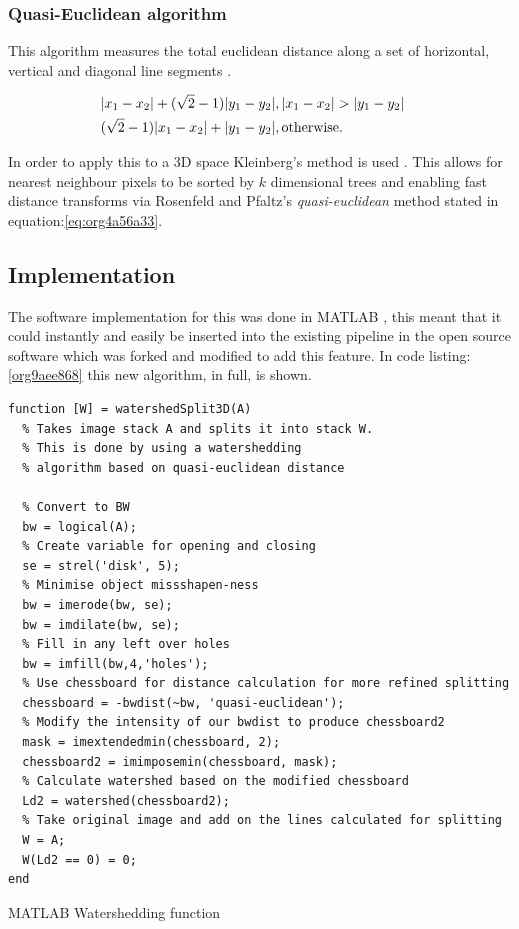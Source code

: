 \documentclass[11pt]{report}
\begin{document}
\subsubsection{Quasi-Euclidean algorithm}
\label{sec:orgfca50f1}

This algorithm measures the total euclidean distance along a set of horizontal, vertical and diagonal
line segments \cite{Pfaltz1966}.

\begin{align}
\label{eq:org4a56a33}
  &\begin{aligned}
&|x_1-x_2|+(\sqrt{2}-1)|y_1-y_2|, |x_1-x_2| > |y_1-y_2| \\
      &(\sqrt{2}-1)|x_1-x_2| + |y_1-y_2|, \textup{otherwise.}
  \end{aligned}
\end{align}

In order to apply this to a 3D space Kleinberg's method is used  \cite{Kleinberg1997}. This allows for nearest neighbour pixels to be sorted by \(k\) dimensional trees
and enabling fast distance transforms via Rosenfeld and Pfaltz's \emph{quasi-euclidean} method stated in equation:\ref{eq:org4a56a33}.

\subsection{Implementation}
\label{sec:orge8f4632}

The software implementation for this was done in MATLAB \cite{MATHWORKS2017}, this meant that it could instantly and easily be inserted into the existing pipeline in the open source software which was forked and modified to add this feature. In code listing:\ref{org9aee868} this new algorithm, in full, is shown.

\begin{listing}[htbp]
\begin{verbatim}
function [W] = watershedSplit3D(A)
  % Takes image stack A and splits it into stack W.
  % This is done by using a watershedding
  % algorithm based on quasi-euclidean distance

  % Convert to BW
  bw = logical(A);
  % Create variable for opening and closing
  se = strel('disk', 5);
  % Minimise object missshapen-ness
  bw = imerode(bw, se);
  bw = imdilate(bw, se);
  % Fill in any left over holes
  bw = imfill(bw,4,'holes');
  % Use chessboard for distance calculation for more refined splitting
  chessboard = -bwdist(~bw, 'quasi-euclidean');
  % Modify the intensity of our bwdist to produce chessboard2
  mask = imextendedmin(chessboard, 2);
  chessboard2 = imimposemin(chessboard, mask);
  % Calculate watershed based on the modified chessboard
  Ld2 = watershed(chessboard2);
  % Take original image and add on the lines calculated for splitting
  W = A;
  W(Ld2 == 0) = 0;
end
\end{verbatim}
\caption{\label{org9aee868}
MATLAB Watershedding function}
\end{listing}
\end{document}
